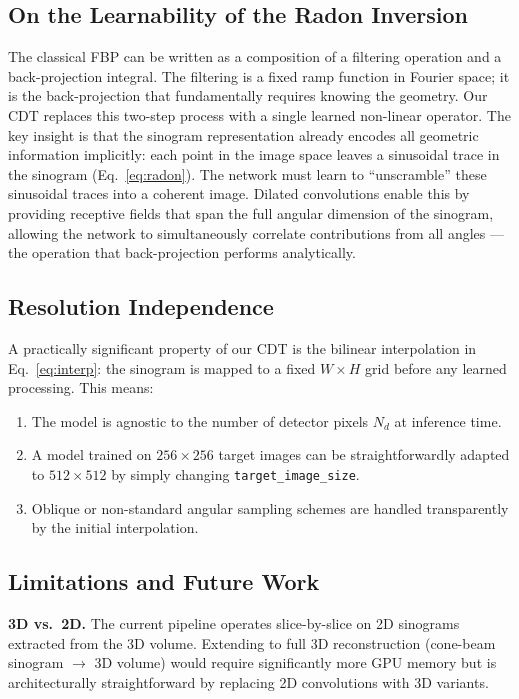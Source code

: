 \documentclass[10pt,twocolumn]{article}
\begin{document}
\subsection{On the Learnability of the Radon Inversion}

The classical FBP can be written as a composition of a filtering
operation and a back-projection integral.
The filtering is a fixed ramp function in Fourier space; it is the
back-projection that fundamentally requires knowing the geometry.
Our CDT replaces this two-step process with a single learned
non-linear operator.
The key insight is that the sinogram representation already encodes
all geometric information implicitly: each point in the image space
leaves a sinusoidal trace in the sinogram (Eq.~\ref{eq:radon}).
The network must learn to ``unscramble'' these sinusoidal traces
into a coherent image.
Dilated convolutions enable this by providing receptive fields that
span the full angular dimension of the sinogram, allowing the
network to simultaneously correlate contributions from all angles
--- the operation that back-projection performs analytically.

\subsection{Resolution Independence}

A practically significant property of our CDT is the bilinear
interpolation in Eq.~\ref{eq:interp}: the sinogram is mapped to a
fixed $W \times H$ grid before any learned processing.
This means:
\begin{enumerate}[leftmargin=*, noitemsep]
    \item The model is agnostic to the number of detector pixels
    $N_d$ at inference time.
    \item A model trained on $256 \times 256$ target images can be
    straightforwardly adapted to $512 \times 512$ by simply changing
    \texttt{target\_image\_size}.
    \item Oblique or non-standard angular sampling schemes are
    handled transparently by the initial interpolation.
\end{enumerate}

\subsection{Limitations and Future Work}

\textbf{3D vs.\ 2D.}
The current pipeline operates slice-by-slice on 2D sinograms extracted
from the 3D volume.
Extending to full 3D reconstruction (cone-beam sinogram $\to$ 3D volume)
would require significantly more GPU memory but is architecturally
straightforward by replacing 2D convolutions with 3D variants.
\end{document}
